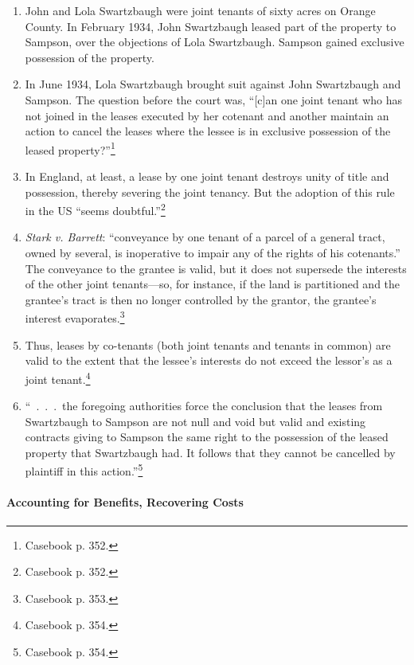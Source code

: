 \begin{enumerate}
    \item John and Lola Swartzbaugh were joint tenants of sixty acres on 
    Orange County. In February 1934, John Swartzbaugh leased part of the 
    property to Sampson, over the objections of Lola Swartzbaugh. Sampson 
    gained exclusive possession of the property.
    \item In June 1934, Lola Swartzbaugh brought suit against John Swartzbaugh 
    and Sampson. The question before the court was, ``[c]an one joint tenant 
    who has not joined in the leases executed by her cotenant and another 
    maintain an action to cancel the leases where the lessee is in exclusive 
    possession of the leased property?''\footnote{Casebook p. 352.}
    \item In England, at least, a lease by one joint tenant destroys unity of 
    title and possession, thereby severing the joint tenancy. But the adoption 
    of this rule in the US ``seems doubtful.''\footnote{Casebook p. 352.}
    \item \emph{Stark v. Barrett}: ``conveyance by one tenant of a parcel of a 
    general tract, owned by several, is inoperative to impair any of the 
    rights of his cotenants.'' The conveyance to the grantee is valid, but it 
    does not supersede the interests of the other joint tenants---so, for 
    instance, if the land is partitioned and the grantee's tract is then no 
    longer controlled by the grantor, the grantee's interest 
    evaporates.\footnote{Casebook p. 353.}
    \item Thus, leases by co-tenants (both joint tenants and tenants in 
    common) are valid to the extent that the lessee's interests do not exceed 
    the lessor's as a joint tenant.\footnote{Casebook p. 354.}
    \item ``~.~.~.~the foregoing authorities force the conclusion that the 
    leases from Swartzbaugh to Sampson are not null and void but valid and 
    existing contracts giving to Sampson the same right to the possession of 
    the leased property that Swartzbaugh had. It follows that they cannot be 
    cancelled by plaintiff in this action.''\footnote{Casebook p. 354.}
\end{enumerate}

\paragraph{Accounting for Benefits, Recovering Costs}

